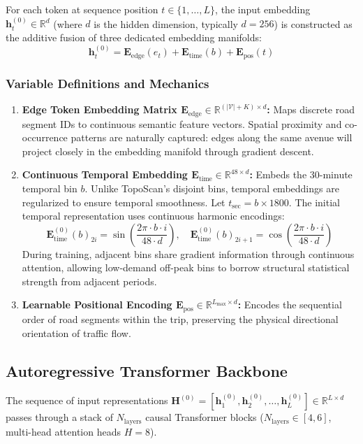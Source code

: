 \documentclass[12pt,a4paper]{article}
\begin{document}
For each token at sequence position $t \in \{1, \dots, L\}$, the input embedding $\mathbf{h}_t^{(0)} \in \mathbb{R}^d$ (where $d$ is the hidden dimension, typically $d=256$) is constructed as the additive fusion of three dedicated embedding manifolds:
\begin{equation}
\mathbf{h}_t^{(0)} = \mathbf{E}_{\text{edge}}(e_t) + \mathbf{E}_{\text{time}}(b) + \mathbf{E}_{\text{pos}}(t)
\end{equation}

\subsubsection{Variable Definitions and Mechanics}
\begin{enumerate}
    \item \textbf{Edge Token Embedding Matrix $\mathbf{E}_{\text{edge}} \in \mathbb{R}^{(|\mathcal{V}|+K) \times d}$:}
    Maps discrete road segment IDs to continuous semantic feature vectors. Spatial proximity and co-occurrence patterns are naturally captured: edges along the same avenue will project closely in the embedding manifold through gradient descent.
    
    \item \textbf{Continuous Temporal Embedding $\mathbf{E}_{\text{time}} \in \mathbb{R}^{48 \times d}$:}
    Embeds the 30-minute temporal bin $b$. Unlike TopoScan's disjoint bins, temporal embeddings are regularized to ensure temporal smoothness. Let $t_{\text{sec}} = b \times 1800$. The initial temporal representation uses continuous harmonic encodings:
    \begin{equation}
    \mathbf{E}_{\text{time}}^{(0)}(b)_{2i} = \sin\left(\frac{2\pi \cdot b \cdot i}{48 \cdot d}\right), \quad \mathbf{E}_{\text{time}}^{(0)}(b)_{2i+1} = \cos\left(\frac{2\pi \cdot b \cdot i}{48 \cdot d}\right)
    \end{equation}
    During training, adjacent bins share gradient information through continuous attention, allowing low-demand off-peak bins to borrow structural statistical strength from adjacent periods.
    
    \item \textbf{Learnable Positional Encoding $\mathbf{E}_{\text{pos}} \in \mathbb{R}^{L_{\max} \times d}$:}
    Encodes the sequential order of road segments within the trip, preserving the physical directional orientation of traffic flow.
\end{enumerate}

\subsection{Autoregressive Transformer Backbone}
The sequence of input representations $\mathbf{H}^{(0)} = [\mathbf{h}_1^{(0)}, \mathbf{h}_2^{(0)}, \dots, \mathbf{h}_L^{(0)}] \in \mathbb{R}^{L \times d}$ passes through a stack of $N_{\text{layers}}$ causal Transformer blocks ($N_{\text{layers}} \in [4, 6]$, multi-head attention heads $H = 8$).
\end{document}
